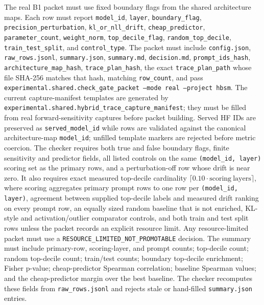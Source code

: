 \documentclass{article}
\begin{document}
The real B1 packet must use fixed boundary flags from the shared architecture
maps. Each row must report \texttt{model\_id}, \texttt{layer},
\texttt{boundary\_flag}, \texttt{precision\_perturbation},
\texttt{kl\_or\_nll\_drift}, \texttt{cheap\_predictor},
\texttt{parameter\_count}, \texttt{weight\_norm},
\texttt{top\_decile\_flag}, \texttt{random\_top\_decile},
\texttt{train\_test\_split}, and \texttt{control\_type}.
The packet must include \texttt{config.json}, \texttt{raw\_rows.jsonl},
\texttt{summary.json}, \texttt{summary.md}, \texttt{decision.md},
\texttt{prompt\_ids\_hash}, \texttt{architecture\_map\_hash},
\texttt{trace\_plan\_hash}, the exact \texttt{trace\_plan\_path} whose file
SHA-256 matches that hash, matching \texttt{row\_count}, and pass
\texttt{experimental.shared.check\_gate\_packet --mode real --project hbsm}.
The current capture-manifest templates are generated by
\texttt{experimental.shared.hybrid\_trace\_capture\_manifest}; they must be
filled from real forward-sensitivity captures before packet building. Served HF
IDs are preserved as \texttt{served\_model\_id} while rows are validated
against the canonical architecture-map \texttt{model\_id}; unfilled template
markers are rejected before metric coercion.
The checker requires both true and false boundary flags, finite sensitivity and
predictor fields, all listed controls on the same \texttt{(model\_id, layer)}
scoring set as the primary rows, and a perturbation-off row whose drift is
near zero. It also requires exact measured top-decile cardinality
\(\lceil 0.10\cdot\mathrm{scoring\ layers}\rceil\), where scoring aggregates
primary prompt rows to one row per \texttt{(model\_id, layer)}, agreement
between supplied top-decile labels and measured drift ranking on every prompt
row, an equally sized
random baseline that is not enriched, KL-style and activation/outlier comparator
controls, and both train and test split rows unless the packet records an
explicit resource limit.
Any resource-limited packet must use a
\texttt{RESOURCE\_LIMITED\_NOT\_PROMOTABLE} decision. The summary must include
primary-row, scoring-layer, and prompt counts; top-decile count; random
top-decile count; train/test counts; boundary top-decile enrichment; Fisher
p-value; cheap-predictor Spearman correlation; baseline Spearman values; and
the cheap-predictor margin over the best baseline. The checker recomputes these
fields from \texttt{raw\_rows.jsonl} and rejects stale or hand-filled
\texttt{summary.json} entries.
\end{document}
